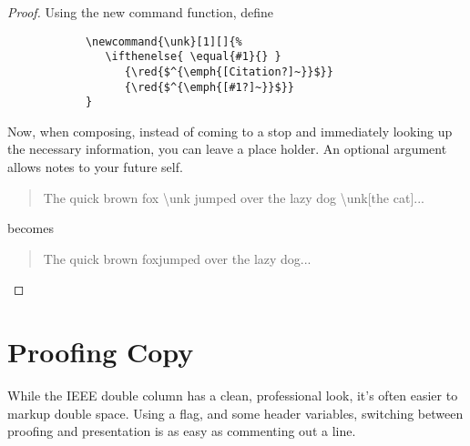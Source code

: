 \documentclass{article}
\begin{document}
\begin{proof}
    Using the new command function, define
    \begin{lstlisting}
            \newcommand{\unk}[1][]{%
               \ifthenelse{ \equal{#1}{} }
                  {\red{$^{\emph{[Citation?]~}}$}}
                  {\red{$^{\emph{[#1?]~}}$}}
            }
    \end{lstlisting}

    Now, when composing, instead of coming to a stop and immediately looking up the necessary information, you can leave a place holder.  An optional argument allows notes to your future self.

    \begin{quote}
        The quick brown fox \textbackslash unk jumped over the lazy dog \textbackslash unk[the cat]...
    \end{quote}

    becomes
    \begin{quote}
        The quick brown fox\unk jumped over the lazy dog...
    \end{quote}
    
\end{proof}

\newpage
\section{Proofing Copy}


While the IEEE double column has a clean, professional look, it's often easier to markup double space.  Using a flag, and some header variables, switching between proofing and presentation is as easy as commenting out a line.
\end{document}
